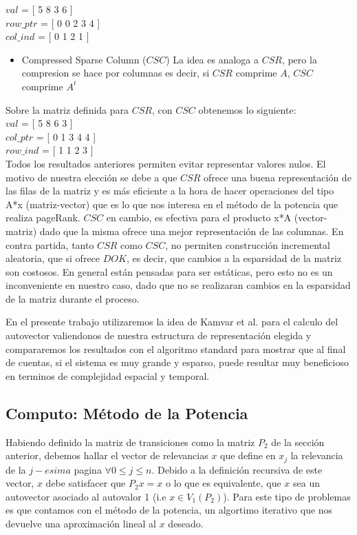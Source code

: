    $val$  = [ 5 8 3 6 ] \\
   $row\_ptr$ = [ 0 0 2 3 4 ] \\
   $col\_ind$ = [ 0 1 2 1 ] \\

\begin{itemize}
\item Compressed Sparse Column ($CSC$)
La idea es analoga a $CSR$, pero la compresion se hace por columnas es decir, si $CSR$ comprime $A$, $CSC$ comprime $A^t$  
\end{itemize}

Sobre la matriz definida para $CSR$, con $CSC$ obtenemos lo siguiente: \\

   $val$  = [ 5 8 6 3 ] \\
   $col\_ptr$ = [ 0 1 3 4 4 ] \\   
   $row\_ind$ = [ 1 1 2 3 ] \\

Todos los resultados anteriores permiten evitar representar valores nulos.	
El motivo de nuestra elección se debe a que $CSR$ ofrece una buena representación de las filas de la matriz y es más eficiente a la hora de hacer operaciones del tipo A*x (matriz-vector) que es lo que nos interesa en el método de la potencia que realiza pageRank. $CSC$ en cambio, es efectiva para el producto x*A (vector-matriz) dado que la misma ofrece una mejor representación de las columnas. En contra partida, tanto $CSR$ como $CSC$, no permiten construcción incremental aleatoria, que si ofrece $DOK$, es decir, que cambios a la esparsidad de la matriz son costosos. En general están pensadas para ser estáticas, pero esto no es un inconveniente en nuestro caso, dado que no se realizaran cambios en la esparsidad de la matriz durante el proceso.

En el presente trabajo utilizaremos la idea de Kamvar et al. \cite[Algoritmo 1]{Kamvar2003} para el calculo del autovector valiendonos de nuestra estructura de representación elegida y compararemos los resultados con el algoritmo standard para mostrar que al final de cuentas, si el sistema es muy grande y esparso, puede resultar muy beneficioso en terminos de complejidad espacial y temporal.

\subsection{Computo: Método de la Potencia}

 Habiendo definido la matriz de transiciones como la matriz $P_2$ de la sección anterior, debemos hallar el vector de relevancias $x$ que define en $x_j$ la relevancia de la $j-esima$ pagina $\forall 0 \leq j \leq n$. Debido a la definición recursiva de este vector, $x$ debe satisfacer que $P_2x=x$ o lo que es equivalente, que $x$ sea un autovector asociado al autovalor 1 (i.e $x \in V_1(P_2)$). Para este tipo de problemas es que contamos con el método de la potencia, un algortimo iterativo que nos devuelve una aproximación lineal al $x$ deseado. 

